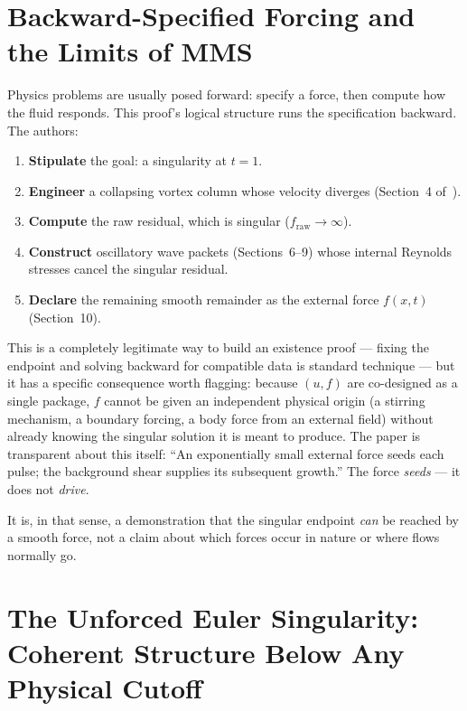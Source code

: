 \documentclass[11pt,a4paper]{article}
\begin{document}
\section{Backward-Specified Forcing and the Limits of MMS}
\label{sec:causality}

Physics problems are usually posed forward: specify a force, then compute how the fluid responds.
This proof's logical structure runs the specification backward. The authors:
\begin{enumerate}
  \item \textbf{Stipulate} the goal: a singularity at $t = 1$.
  \item \textbf{Engineer} a collapsing vortex column whose velocity diverges
        (Section~4 of~\cite{OpenAI2026}).
  \item \textbf{Compute} the raw residual, which is singular ($f_{\text{raw}} \to \infty$).
  \item \textbf{Construct} oscillatory wave packets (Sections~6--9) whose internal Reynolds
        stresses cancel the singular residual.
  \item \textbf{Declare} the remaining smooth remainder as the external force $f(x,t)$
        (Section~10).
\end{enumerate}

This is a completely legitimate way to build an existence proof --- fixing the endpoint and solving
backward for compatible data is standard technique --- but it has a specific consequence worth
flagging: because $(u,f)$ are co-designed as a single package, $f$ cannot be given an independent
physical origin (a stirring mechanism, a boundary forcing, a body force from an external field)
without already knowing the singular solution it is meant to produce. The paper is transparent
about this itself: ``An exponentially small external force seeds each pulse; the background shear
supplies its subsequent growth.'' The force \emph{seeds} --- it does not \emph{drive}.

It is, in that sense, a demonstration that the singular endpoint \emph{can} be reached by a smooth
force, not a claim about which forces occur in nature or where flows normally go.

\section{The Unforced Euler Singularity: Coherent Structure Below Any Physical Cutoff}
\label{sec:euler}
\end{document}
